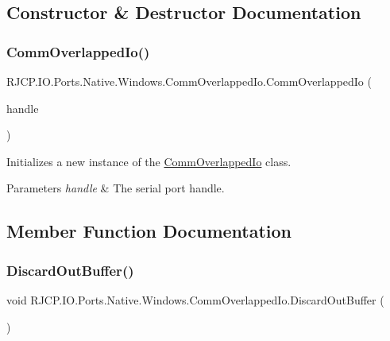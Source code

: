\subsection{Constructor \& Destructor Documentation}
\mbox{\label{class_r_j_c_p_1_1_i_o_1_1_ports_1_1_native_1_1_windows_1_1_comm_overlapped_io_aa2fc2f81a36458c4d1f3ed13816e7053}} 
\subsubsection{\texorpdfstring{CommOverlappedIo()}{CommOverlappedIo()}}
{\footnotesize\ttfamily R\+J\+C\+P.\+I\+O.\+Ports.\+Native.\+Windows.\+Comm\+Overlapped\+Io.\+Comm\+Overlapped\+Io (\begin{DoxyParamCaption}\item[{Safe\+File\+Handle}]{handle }\end{DoxyParamCaption})}



Initializes a new instance of the \mbox{\hyperlink{class_r_j_c_p_1_1_i_o_1_1_ports_1_1_native_1_1_windows_1_1_comm_overlapped_io}{Comm\+Overlapped\+Io}} class. 


\begin{DoxyParams}{Parameters}
{\em handle} & The serial port handle.\\
\hline
\end{DoxyParams}


\subsection{Member Function Documentation}
\mbox{\label{class_r_j_c_p_1_1_i_o_1_1_ports_1_1_native_1_1_windows_1_1_comm_overlapped_io_a31b15119e506ec310bde2d3082aaec85}} 
\subsubsection{\texorpdfstring{DiscardOutBuffer()}{DiscardOutBuffer()}}
{\footnotesize\ttfamily void R\+J\+C\+P.\+I\+O.\+Ports.\+Native.\+Windows.\+Comm\+Overlapped\+Io.\+Discard\+Out\+Buffer (\begin{DoxyParamCaption}{ }\end{DoxyParamCaption})}



